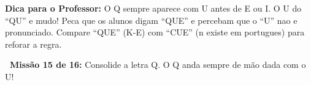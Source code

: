 \begin{dica}
\textbf{Dica para o Professor:} O Q sempre aparece com U antes de E ou I. O U do ``QU'' e mudo! Peca que os alunos digam ``QUE'' e percebam que o ``U'' nao e pronunciado. Compare ``QUE'' (K-E) com ``CUE'' (n existe em portugues) para reforar a regra.
\end{dica}





\begin{missao}
\textbf{\faGamepad~Miss\~a{}o 15 de 16:} Consolide a letra Q. O Q anda sempre de m\~a{}o dada com o U!
\end{missao}

